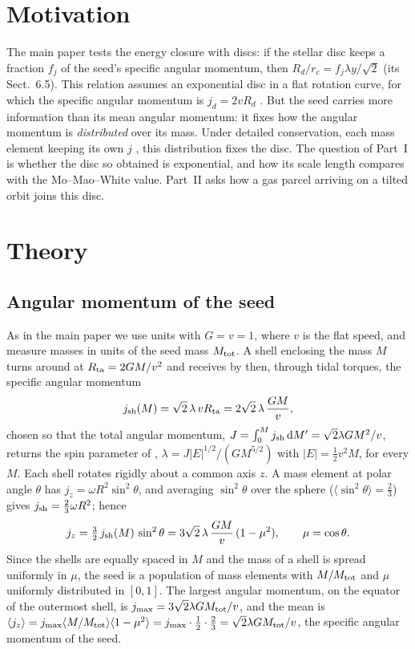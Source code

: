 \documentclass[11pt,a4paper]{article}
\newcommand{\dd}{\mathrm{d}}
\newcommand{\rc}{r_c}
\begin{document}
\section{Motivation}

The main paper tests the energy closure with discs: if the stellar disc
keeps a fraction $f_j$ of the seed's specific angular momentum, then
$R_d/\rc=f_j\lambda y/\sqrt2$ (its Sect.~6.5). This relation assumes an
exponential disc in a flat rotation curve, for which the specific angular
momentum is $j_d=2vR_d$ \citep{Fall1980,Mo1998}. But the seed carries
more information than its mean angular momentum: it fixes how the
angular momentum is \emph{distributed} over its mass. Under detailed
conservation, each mass element keeping its own $j$
\citep{Mestel1963,Fall1980}, this distribution fixes the disc. The
question of Part~I is whether the disc so obtained is exponential, and
how its scale length compares with the Mo--Mao--White value. Part~II asks how
a gas parcel arriving on a tilted orbit joins this disc.

\section{Theory}

\subsection{Angular momentum of the seed}

As in the main paper we use units with $G=v=1$, where $v$ is the flat
speed, and measure masses in units of the seed mass $M_{\rm tot}$. A shell
enclosing the mass $M$ turns around at $R_{\rm ta}=2GM/v^2$ and receives
by then, through tidal torques, the specific angular momentum
\begin{equation}
  j_{\rm sh}(M)=\sqrt2\,\lambda\,vR_{\rm ta}=2\sqrt2\,\lambda\,\frac{GM}{v},
  \label{eq:jsh}
\end{equation}
chosen so that the total angular momentum, $J=\int_0^Mj_{\rm sh}\,\dd M'=\sqrt2\lambda GM^2/v$,
returns the spin parameter of \citet{Peebles1969},
$\lambda=J|E|^{1/2}/(GM^{5/2})$ with $|E|=\tfrac12v^2M$, for every $M$.
Each shell rotates rigidly about a common axis $z$. A mass element at
polar angle $\theta$ has $j_z=\omega R^2\sin^2\theta$, and averaging
$\sin^2\theta$ over the sphere ($\langle\sin^2\theta\rangle=\tfrac23$)
gives $j_{\rm sh}=\tfrac23\omega R^2$; hence
\begin{equation}
  j_z=\tfrac32\,j_{\rm sh}(M)\,\sin^2\theta
     =3\sqrt2\,\lambda\,\frac{GM}{v}\,(1-\mu^2),\qquad \mu=\cos\theta .
  \label{eq:jz}
\end{equation}
Since the shells are equally spaced in $M$ and the mass of a shell is
spread uniformly in $\mu$, the seed is a population of mass elements
with $M/M_{\rm tot}$ and $\mu$ uniformly distributed in $[0,1]$. The
largest angular momentum, on the equator of the outermost shell, is
$j_{\max}=3\sqrt2\lambda GM_{\rm tot}/v$, and the mean is
$\langle j_z\rangle=j_{\max}\langle M/M_{\rm tot}\rangle\langle1-\mu^2\rangle
=j_{\max}\cdot\tfrac12\cdot\tfrac23=\sqrt2\lambda GM_{\rm tot}/v$, the
specific angular momentum of the seed.
\end{document}
